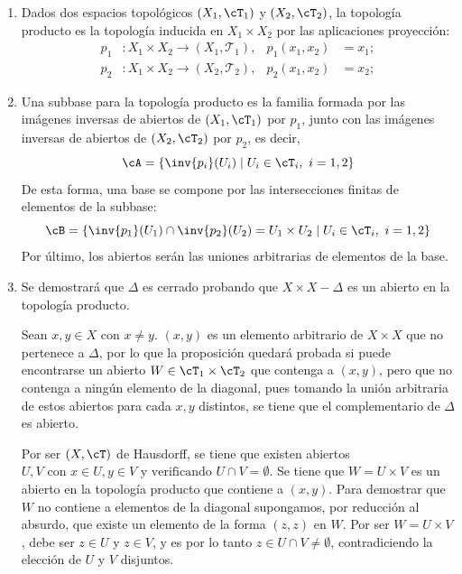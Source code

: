 \begin{solucion}
    \vspace{-0.5em}
    \begin{enumerate}[label=\alph*)]
        \item Dados dos espacios topológicos $(X_1,\cT_1)$ y $(X_2,\cT_2)$, la topología producto es la topología inducida en $X_1 \times X_2$ por las aplicaciones proyección: 
        \[
        \begin{aligned}
            p_1&\colon X_1\times X_2 \to (X_1,\mathcal{T}_1),
            & p_1(x_1,x_2)&=x_1;                \\
            p_2&\colon X_1\times X_2 \to (X_2,\mathcal{T}_2),
            & p_2(x_1,x_2)&=x_2;
        \end{aligned}
        \]
        \item Una subbase para la topología producto es la familia formada por las imágenes inversas de abiertos de $(X_1,\cT_1)$ por $p_1$, junto con las imágenes inversas de abiertos de $(X_2,\cT_2)$ por $p_2$, es decir, \[\cA = \{\inv{p_i}(U_i) \mid U_i \in \cT_i, \ i = 1,2\}\]
        De esta forma, una base se compone por las intersecciones finitas de elementos de la subbase: \[\cB = \{\inv{p_1}(U_1) \cap \inv{p_2}(U_2) = U_1 \times U_2 \mid U_i \in \cT_i, \ i = 1,2\}\]
        Por último, los abiertos serán las uniones arbitrarias de elementos de la base.

        \item Se demostrará que $\Delta$ es cerrado probando que $X \times X - \Delta$ es un abierto en la topología producto. 
        
        Sean $x,y\in X \text{ con } x \neq y$. $(x,y)$ es un elemento arbitrario de $X \times X$ que no pertenece a $\Delta$, por lo que la proposición quedará probada si puede encontrarse un abierto $W \in \cT_1 \times \cT_2$ que contenga a $(x,y)$, pero que no contenga a ningún elemento de la diagonal, pues tomando la unión arbitraria de estos abiertos para cada $x,y$ distintos, se tiene que el complementario de $\Delta$ es abierto.

        Por ser $(X,\cT)$ de Hausdorff, se tiene que existen abiertos $U,V \text{ con } x\in U, y \in V \text{ y verificando } U \cap V = \emptyset$. Se tiene que $W = U \times V$ es un abierto en la topología producto que contiene a $(x,y)$. Para demostrar que $W$ no contiene a elementos de la diagonal supongamos, por reducción al absurdo, que existe un elemento de la forma $(z,z)$ en $W$. Por ser $W = U \times V$, debe ser $z \in U$ y $z \in V $, y es por lo tanto $z \in U \cap V \neq \emptyset$, contradiciendo la elección de $U$ y $V$ disjuntos.


\end{enumerate}
\end{solucion}
